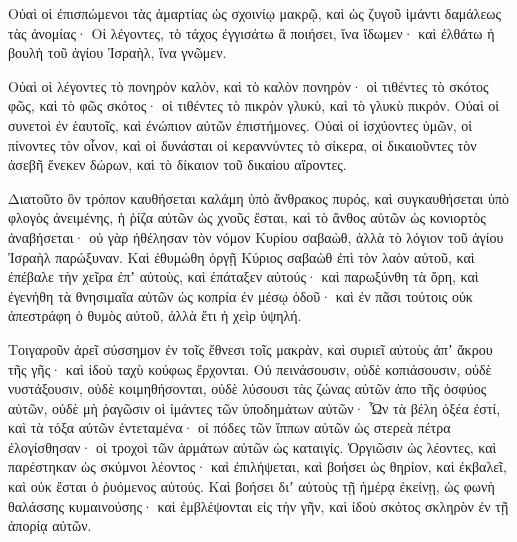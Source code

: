 {\par }{\PP {}Οὐαὶ οἱ ἐπισπώμενοι τὰς ἁμαρτίας ὡς σχοινίῳ μακρῷ, καὶ ὡς ζυγοῦ ἱμάντι δαμάλεως τὰς ἀνομίας·
Οἱ λέγοντες, τὸ τάχος ἐγγισάτω ἃ ποιήσει, ἵνα ἴδωμεν· καὶ ἐλθάτω ἡ βουλὴ τοῦ ἁγίου Ἰσραὴλ, ἵνα γνῶμεν.
\par }{\PP {}Οὐαὶ οἱ λέγοντες τὸ πονηρὸν καλὸν, καὶ τὸ καλὸν πονηρὸν· οἱ τιθέντες τὸ σκότος φῶς, καὶ τὸ φῶς σκότος· οἱ τιθέντες τὸ πικρὸν γλυκὺ, καὶ τὸ γλυκὺ πικρόν.
Οὐαὶ οἱ συνετοὶ ἐν ἑαυτοῖς, καὶ ἐνώπιον αὐτῶν ἐπιστήμονες.
Οὐαὶ οἱ ἰσχύοντες ὑμῶν, οἱ πίνοντες τὸν οἶνον, καὶ οἱ δυνάσται οἱ κεραννύντες τὸ σίκερα,
οἱ δικαιοῦντες τὸν ἀσεβῆ ἕνεκεν δώρων, καὶ τὸ δίκαιον τοῦ δικαίου αἴροντες.
\par }{\PP {}Διατοῦτο ὃν τρόπον καυθήσεται καλάμη ὑπὸ ἄνθρακος πυρός, καὶ συγκαυθήσεται ὑπὸ φλογὸς ἀνειμένης, ἡ ῥίζα αὐτῶν ὡς χνοῦς ἔσται, καὶ τὸ ἄνθος αὐτῶν ὡς κονιορτὸς ἀναβήσεται· οὐ γὰρ ἠθέλησαν τὸν νόμον Κυρίου σαβαὼθ, ἀλλὰ τὸ λόγιον τοῦ ἁγίου Ἰσραὴλ παρώξυναν.
Καὶ ἐθυμώθη ὀργῇ Κύριος σαβαὼθ ἐπὶ τὸν λαὸν αὐτοῦ, καὶ ἐπέβαλε τὴν χεῖρα ἐπʼ αὐτοὺς, καὶ ἐπάταξεν αὐτούς· καὶ παρωξύνθη τὰ ὄρη, καὶ ἐγενήθη τὰ θνησιμαῖα αὐτῶν ὡς κοπρία ἐν μέσῳ ὁδοῦ· καὶ ἐν πᾶσι τούτοις οὐκ ἀπεστράφη ὁ θυμὸς αὐτοῦ, ἀλλὰ ἔτι ἡ χεὶρ ὑψηλή.
\par }{\PP {}Τοιγαροῦν ἀρεῖ σύσσημον ἐν τοῖς ἔθνεσι τοῖς μακρὰν, καὶ συριεῖ αὐτοὺς ἀπʼ ἄκρου τῆς γῆς· καὶ ἰδοὺ ταχὺ κούφως ἔρχονται.
Οὐ πεινάσουσιν, οὐδὲ κοπιάσουσιν, οὐδὲ νυστάξουσιν, οὐδὲ κοιμηθήσονται, οὐδὲ λύσουσι τὰς ζώνας αὐτῶν ἀπο τῆς ὀσφύος αὐτῶν, οὐδὲ μὴ ῥαγῶσιν οἱ ἱμάντες τῶν ὑποδημάτων αὐτῶν·
Ὧν τὰ βέλη ὀξέα ἐστί, καὶ τὰ τόξα αὐτῶν ἐντεταμένα· οἱ πόδες τῶν ἵππων αὐτῶν ὡς στερεὰ πέτρα ἐλογίσθησαν· οἱ τροχοὶ τῶν ἁρμάτων αὐτῶν ὡς καταιγίς.
Ὀργιῶσιν ὡς λέοντες, καὶ παρέστηκαν ὡς σκύμνοι λέοντος· καὶ ἐπιλήψεται, καὶ βοήσει ὡς θηρίον, καὶ ἐκβαλεῖ, καὶ οὐκ ἔσται ὁ ῥυόμενος αὐτούς.
Καὶ βοήσει διʼ αὐτοὺς τῇ ἡμέρᾳ ἐκείνῃ, ὡς φωνὴ θαλάσσης κυμαινούσης· καὶ ἐμβλέψονται εἰς τὴν γῆν, καὶ ἰδοὺ σκότος σκληρὸν ἐν τῇ ἀπορίᾳ αὐτῶν.

}
